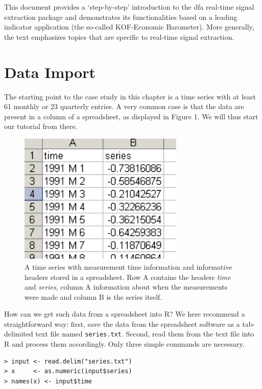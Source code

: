 \documentclass[a4paper]{article}
\begin{document}
This document provides a `step-by-step' introduction to the dfa
real-time signal extraction package and demonstrates its
functionalities based on a leading indicator application (the
so-called KOF-Economic Barometer). More generally, the text emphasizes
topics that are specific to real-time signal extraction. 

\section{Data Import}

The starting point to the case study in this chapter is a time series
with at least 61 monthly or 23 quarterly entries. A very common case
is that the data are present in a column of a spreadsheet, as
displayed in Figure 1. We will thus start our tutorial from there. 

\begin{figure}[h!] 
\begin{center}
\includegraphics[width=0.7\textwidth]{excelneu}
\caption{A time series with measurement time information and
  informative headers stored in a spreadsheet. Row A contains
  the headers \emph{time} and \emph{series}, column A information
  about when the measurements were made and column B is the series
  itself.} 
\end{center}
\end{figure}

How can we get such data from a spreadsheet into R? We here recommend
a straightforward way: first, save the data from the spreadsheet
software as a tab-delimited text file named \texttt{series.txt}. 
Second, read them from the text file into R and process them
accordingly. Only three simple commands are necessary. 

\begin{verbatim}
> input <- read.delim("series.txt")
> x     <- as.numeric(input$series)
> names(x) <- input$time
\end{verbatim}
\end{document}

